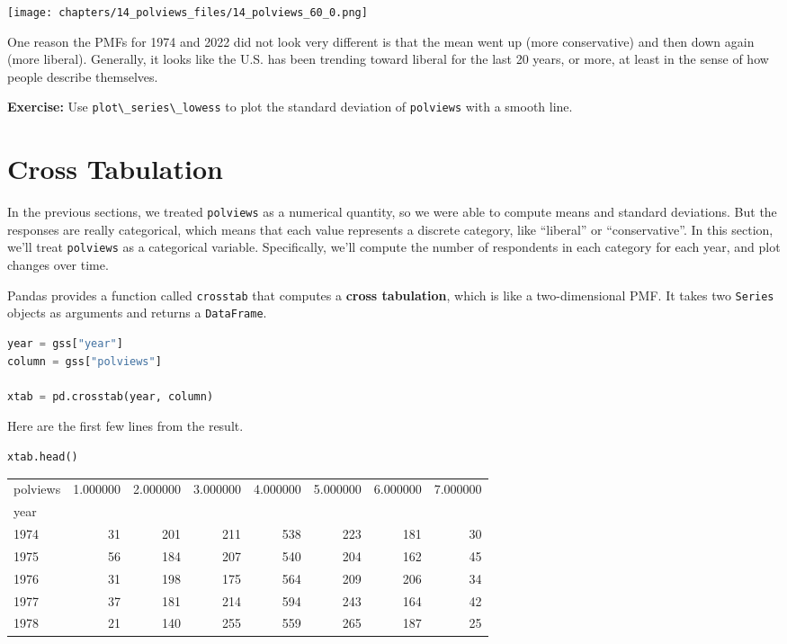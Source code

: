\begin{center}
\texttt{[image: chapters/14\_polviews\_files/14\_polviews\_60\_0.png]}
\end{center}

One reason the PMFs for 1974 and 2022 did not look very different is
that the mean went up (more conservative) and then down again (more
liberal). Generally, it looks like the U.S. has been trending toward
liberal for the last 20 years, or more, at least in the sense of how
people describe themselves.

\textbf{Exercise:} Use \passthrough{\lstinline!plot\_series\_lowess!} to
plot the standard deviation of \passthrough{\lstinline!polviews!} with a
smooth line.

\section{Cross Tabulation}\label{cross-tabulation}

In the previous sections, we treated \passthrough{\lstinline!polviews!}
as a numerical quantity, so we were able to compute means and standard
deviations. But the responses are really categorical, which means that
each value represents a discrete category, like ``liberal'' or
``conservative''. In this section, we'll treat
\passthrough{\lstinline!polviews!} as a categorical variable.
Specifically, we'll compute the number of respondents in each category
for each year, and plot changes over time.

Pandas provides a function called \passthrough{\lstinline!crosstab!}
that computes a \textbf{cross tabulation}, which is like a
two-dimensional PMF. It takes two \passthrough{\lstinline!Series!}
objects as arguments and returns a \passthrough{\lstinline!DataFrame!}.

\begin{lstlisting}[language=Python,style=source]
year = gss["year"]
column = gss["polviews"]

xtab = pd.crosstab(year, column)
\end{lstlisting}

Here are the first few lines from the result.

\begin{lstlisting}[language=Python,style=source]
xtab.head()
\end{lstlisting}

\begin{tabular}{lrrrrrrr}
\midrule
polviews & 1.000000 & 2.000000 & 3.000000 & 4.000000 & 5.000000 & 6.000000 & 7.000000 \\
year &  &  &  &  &  &  &  \\
\midrule
1974 & 31 & 201 & 211 & 538 & 223 & 181 & 30 \\
1975 & 56 & 184 & 207 & 540 & 204 & 162 & 45 \\
1976 & 31 & 198 & 175 & 564 & 209 & 206 & 34 \\
1977 & 37 & 181 & 214 & 594 & 243 & 164 & 42 \\
1978 & 21 & 140 & 255 & 559 & 265 & 187 & 25 \\
\midrule
\end{tabular}

